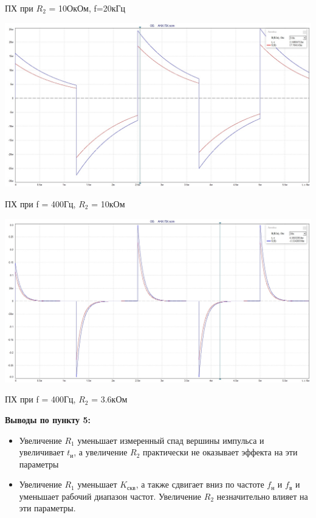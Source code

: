 \documentclass[a4paper,14pt]{extarticle}
\begin{document}
    ПХ при $R_2$ = 10ОкОм, f=20кГц

    \begin{center}
        \includegraphics[scale=0.3]{5.3.jpg}
    \end{center}
    
    ПХ при f = 400Гц, $R_2$ = 10кОм 

    \begin{center}
        \includegraphics[scale=0.3]{5.4.jpg}
    \end{center}

    ПХ при f = 400Гц, $R_2$ = 3.6кОм 

    \textbf{Выводы по пункту 5:}
    \vspace{-6ex}
    \begin{singlespace}
        \begin{itemize}
           \item Увеличение $R_1$ уменьшает измеренный спад вершины импульса и увеличивает 
           $t_{\text{и}}$, а увеличение $R_2$ практически не оказывает эффекта на эти параметры 
           \item Увеличение $R_1$ уменьшает $K_{\text{скв}}$, а также сдвигает вниз по 
           частоте $f_{\text{н}}$ и $f_{\text{в}}$ и уменьшает рабочий диапазон частот. 
           Увеличение $R_2$ незначительно влияет на эти параметры.
        \end{itemize}
    \end{singlespace}
\end{document}
